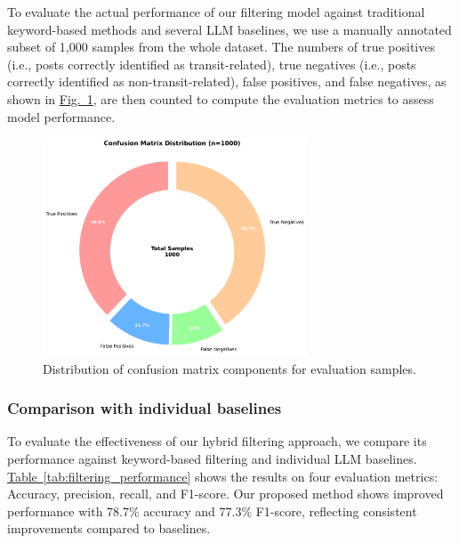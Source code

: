 \documentclass[a4paper,fleqn,12pt]{cas-sc}
\begin{document}
To evaluate the actual performance of our filtering model against traditional keyword-based methods and several LLM baselines, we use a manually annotated subset of 1,000 samples from the whole dataset. The numbers of true positives (i.e., posts correctly identified as transit-related), true negatives (i.e., posts correctly identified as non-transit-related), false positives, and false negatives, as shown in \hyperref[fig:confusion_matrix_donut]{Fig.~\ref{fig:confusion_matrix_donut}}, are then counted to compute the evaluation metrics to assess model performance.

\begin{figure}[htbp]
    \centering
    \includegraphics[width=0.7\textwidth]{figs/confusion_matrix_donut.pdf}
    \caption{Distribution of confusion matrix components for evaluation samples.}
    \label{fig:confusion_matrix_donut}
\end{figure}

\subsubsection{Comparison with individual baselines}

To evaluate the effectiveness of our hybrid filtering approach, we compare its performance against keyword-based filtering and individual LLM baselines. \hyperref[tab:filtering_performance]{Table~\ref{tab:filtering_performance}} shows the results on four evaluation metrics: Accuracy, precision, recall, and F1-score. Our proposed method shows improved performance with 78.7\% accuracy and 77.3\% F1-score, reflecting consistent improvements compared to baselines.
\end{document}
